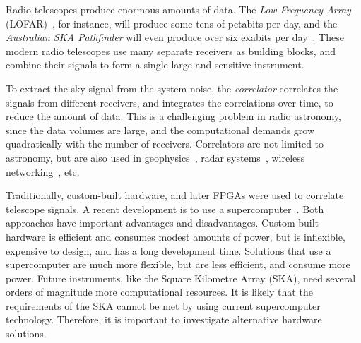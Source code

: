 \documentclass{article}
\begin{document}
Radio telescopes produce enormous amounts of data.
The \emph{Low-Frequency Array\/} (LOFAR)~\cite{deVos:09}, for instance, will produce some tens
of petabits per day, and the \emph{Australian SKA Pathfinder\/} will
even produce over six exabits per day~\cite{askap}.
These modern radio telescopes use many separate receivers as building blocks,
and combine their signals to form a single large and sensitive instrument.

To extract the sky signal from the system noise, the \emph{correlator\/}
correlates the signals from different receivers, and integrates the
correlations over time, to reduce the amount of data.
This is a challenging problem in radio astronomy,
since the data volumes are large, and the computational demands grow
quadratically with the number of receivers.
Correlators are not limited to astronomy, but are also used 
in geophysics~\cite{correlator-geophysics},
radar systems~\cite{correlator-radar}, 
wireless networking~\cite{correlator-wireless}, etc.

Traditionally, custom-built hardware, and later FPGAs were used to correlate telescope signals.
A recent development is to use a supercomputer~\cite{Romein:06}.
Both approaches have important advantages and disadvantages.
Custom-built hardware is efficient and consumes modest amounts of power, but is
inflexible, expensive to design, and has a long development time.
Solutions that use a supercomputer are much more flexible, but are less
efficient, and consume more power. %
Future instruments, like the Square Kilometre Array (SKA), need several orders
of magnitude more computational resources.
It is likely that the requirements of the SKA cannot be met by using
current supercomputer technology. Therefore, it is important to investigate
alternative hardware solutions.
\end{document}
